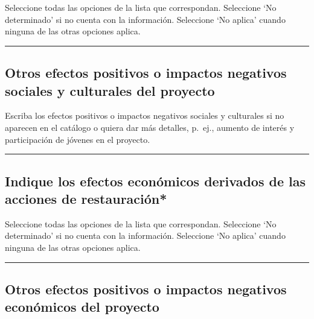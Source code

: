 \documentclass[
]{book}
\begin{document}
Seleccione todas las opciones de la lista que correspondan.
Seleccione `No determinado' si no cuenta con la información.
Seleccione `No aplica' cuando ninguna de las otras opciones aplica.

\begin{center}\rule{0.5\linewidth}{0.5pt}\end{center}

\hypertarget{otros-efectos-positivos-o-impactos-negativos-sociales-y-culturales-del-proyecto}{%
\subsection*{Otros efectos positivos o impactos negativos sociales y culturales del proyecto}\label{otros-efectos-positivos-o-impactos-negativos-sociales-y-culturales-del-proyecto}}

Escriba los efectos positivos o impactos negativos sociales y culturales si no aparecen en el catálogo o quiera dar más detalles, p.~ej., aumento de interés y participación de jóvenes en el proyecto.

\begin{center}\rule{0.5\linewidth}{0.5pt}\end{center}

\hypertarget{indique-los-efectos-econuxf3micos-derivados-de-las-acciones-de-restauraciuxf3n}{%
\subsection*{\texorpdfstring{{Indique los efectos económicos derivados de las acciones de restauración*}}{Indique los efectos económicos derivados de las acciones de restauración*}}\label{indique-los-efectos-econuxf3micos-derivados-de-las-acciones-de-restauraciuxf3n}}

Seleccione todas las opciones de la lista que correspondan.
Seleccione `No determinado' si no cuenta con la información.
Seleccione `No aplica' cuando ninguna de las otras opciones aplica.

\begin{center}\rule{0.5\linewidth}{0.5pt}\end{center}

\hypertarget{otros-efectos-positivos-o-impactos-negativos-econuxf3micos-del-proyecto}{%
\subsection*{Otros efectos positivos o impactos negativos económicos del proyecto}\label{otros-efectos-positivos-o-impactos-negativos-econuxf3micos-del-proyecto}}
\end{document}
